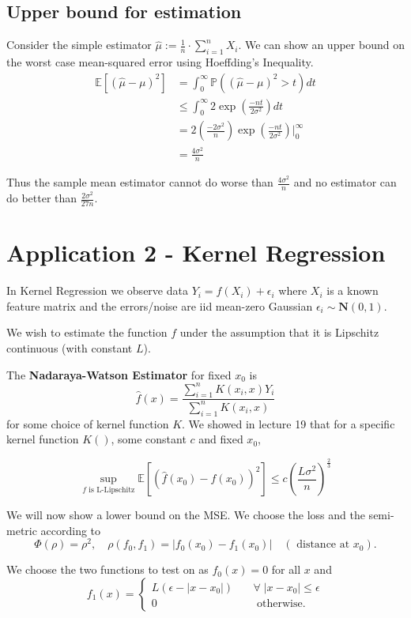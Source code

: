 \documentclass{article}
\newcommand{\Ev}{\mathbb{E}}
\begin{document}
	\subsection{Upper bound for estimation}
	Consider the simple estimator $\hat{\mu} := \frac{1}{n}\cdot \sum_{i=1}^n X_i$. We can show an upper bound on the worst case mean-squared error using Hoeffding's Inequality. 
	\begin{align*}
	\Ev [(\hat{\mu}-\mu)^2] &= \int_0^\infty \mathbb{P}\left((\hat{\mu} - \mu)^2 > t \right) dt \\
	& \leq \int_0^\infty 2 \exp\left(\frac{-nt}{2\sigma^2}\right) dt \\
	& = 2 \left(\frac{-2\sigma^2}{n}\right)  \exp \left(\frac{-nt}{2\sigma^2}\right) \bigg\rvert_0^{\infty}\\
	&= \frac{4\sigma^2}{n}
	\end{align*}
	
	Thus the sample mean estimator cannot do worse than $\frac{4\sigma^2}{n}$ and no estimator can do better than $\frac{2\sigma^2}{27n}$. 
	
	\section{Application 2 - Kernel Regression}
	In Kernel Regression we observe data $Y_i = f(X_i) + \epsilon_i$ where $X_i$ is a known feature matrix and the errors/noise are iid mean-zero Gaussian $\epsilon_i \sim \mathbf{N}(0,1)$. 
	
	We wish to estimate the function $f$ under the assumption that it is Lipschitz continuous (with constant $L$). 
	
	
	The \textbf{Nadaraya-Watson
		Estimator} for fixed $x_0$ is
	\[ 
	\hat{f}(x) = \frac{
		\sum_{i=1}^n K(x_i,x)Y_i}{
		\sum_{i=1}^n K(x_i,x)}
	\]
	for some choice of kernel function $K$. We showed in lecture 19 that for a specific kernel function $K()$, some constant $c$ and fixed $x_0$,
	
	\[ \sup_{f \text{ is L-Lipschitz}} \Ev \left[ (\hat{f}(x_0) - f(x_0))^2 \right] \leq c\left(\frac{L\sigma^2}{n}\right)^{\frac{2}{3}}\]
	
	We will now show a lower bound on the MSE. We choose the loss and the semi-metric according to
	\[
	\Phi(\rho) = \rho^2, \quad \rho(f_0,f_1) = |f_0(x_0) - f_1(x_0)| \quad (\text{ distance at } x_0).
	\]
	
	We choose the two functions to test on as $f_0(x) = 0$ for all $x$ and 
	\[f_1(x) = \begin{cases}
	L(\epsilon - |x - x_0|) &\quad \forall \; |x- x_0| \leq \epsilon \\
	0 &\quad \text{ otherwise}. 
	\end{cases}
	\]
	
\end{document}
